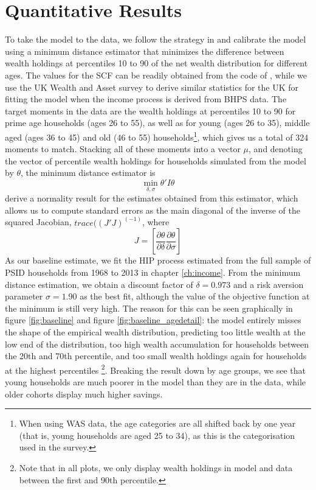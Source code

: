 \section{Quantitative Results}\label{sec:qr}
To take the model to the data, we follow the strategy in \citet{HintermaierKoeniger2011}
and calibrate the model using a minimum 
distance estimator that minimizes the difference between wealth holdings at percentiles 
10 to 90 of the net wealth distribution for different ages. The values for the 
SCF can be readily obtained from the code of \citet{HintermaierKoeniger2011}, 
while we use the UK Wealth and Asset survey to derive similar statistics for the 
UK for fitting the model when the income process is derived from BHPS data.
The target moments in the data are the wealth holdings at percentiles 10 to 90
for prime age households (ages 26 to 55), as well as for young (ages 26 to 35), 
middle aged (ages 36 to 45) and old (46 to 55) households\footnote{When using 
WAS data, the age categories are all shifted back by one year (that is, young 
households are aged 25 to 34), as this is the categorisation used in the survey.},
which gives us a total of 324 moments to match. Stacking all of these moments
into a vector $\mu$, and denoting the vector of percentile wealth holdings
for households simulated from the model by $\theta$, the minimum distance estimator is 
$$
\min_{\delta, \sigma} \theta' I \theta
$$
\citet{HintermaierKoeniger2011} derive a normality result for the estimates obtained
from this estimator, which allows us to compute standard errors as the main 
diagonal of the inverse of the squared Jacobian, $trace((J'J)^(-1)$, where
$$
J = \left[ \frac{\partial \theta}{\partial \delta} \frac{\partial \theta}{\partial \sigma} \right]
$$
As our baseline estimate, we fit the HIP process estimated from the full sample 
of PSID households from 1968 to 2013 in chapter \ref{ch:income}. From the minimum 
distance estimation, we obtain a discount factor of $\delta=0.973$ and a risk 
aversion parameter $\sigma=1.90$ as the best fit, although the value of the objective
function at the minimum is still very high. The reason for this can be seen
graphically in figure \ref{fig:baseline} and figure \ref{fig:baseline_agedetail}:
the model entirely misses the shape of the empirical wealth distribution, predicting
too little wealth at the low end of the distribution, too high 
wealth accumulation for households between the 20th and 70th percentile, and
too small wealth holdings again for households at the highest percentiles
\footnote{Note that in all plots, we only display wealth holdings in model and 
data between the first and 90th percentile.}. Breaking the result down by age 
groups, we see that young households are much poorer in the model than they are
in the data, while older cohorts display much higher savings. 

